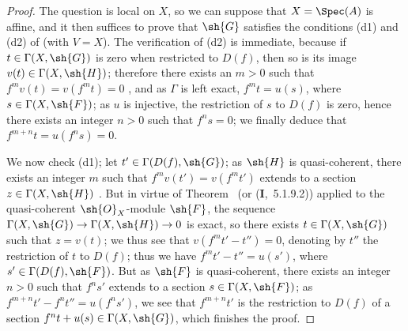 \begin{proof}
The question is local on $X$, so we can suppose that $X=\Spec(A)$ is affine, and it then suffices to prove that $\sh{G}$ satisfies the conditions (d1) and (d2) of  (with $V=X$).
The verification of (d2) is immediate, because if $t\in\Gamma(X,\sh{G})$ is zero when restricted to $D(f)$, then so is its image $v(t)\in\Gamma(X,\sh{H})$; therefore there exists an $m>0$ such that $f^m v(t)=v(f^m t)=0$ , and as $\Gamma$ is left exact, $f^m t=u(s)$, where $s\in\Gamma(X,\sh{F})$; as $u$ is injective, the restriction of $s$ to $D(f)$ is zero, hence  there exists an integer $n>0$ such that $f^n s=0$; we finally deduce that $f^{m+n}t=u(f^n s)=0$.

We now check (d1); let $t'\in\Gamma(D(f),\sh{G})$; as $\sh{H}$ is quasi-coherent, there exists an integer $m$ such that $f^m v(t')=v(f^m t')$ extends to a section $z\in\Gamma(X,\sh{H})$ .
But in virtue of Theorem~ (or (\textbf{I},~5.1.9.2)) applied to the quasi-coherent $\sh{O}_X$-module $\sh{F}$, the sequence $\Gamma(X,\sh{G})\to\Gamma(X,\sh{H})\to 0$ is exact, so there exists $t\in\Gamma(X,\sh{G})$ such that $z=v(t)$; we thus see that $v(f^m t'-t'')=0$, denoting by $t''$ the restriction of $t$ to $D(f)$; thus we have $f^m t'-t''=u(s')$, where $s'\in\Gamma(D(f),\sh{F})$.
But as $\sh{F}$ is quasi-coherent, there exists an integer $n>0$ such that $f^n s'$ extends to a section $s\in\Gamma(X,\sh{F})$; as $f^{m+n}t'-f^n t''=u(f^n s')$, we see that $f^{m+n}t'$ is the restriction to $D(f)$ of a section $f^n t+u(s)\in\Gamma(X,\sh{G})$, which finishes the proof.
\end{proof}
